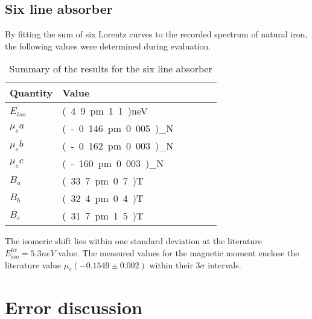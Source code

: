 \subsection{Six line absorber}
By fitting the sum of six Lorentz curves to the recorded spectrum of natural iron, the following values were determined during evaluation.
\begin{table}[H]\centering
	\begin{tabular}{@{}llllll@{}}
		\toprule
		 Quantity& Value \\
		\midrule
		$\overline{E_{iso}}$ & \unit{(4.9\pm1.1)}{neV}\\
		$\mu_ea$ & \unit{(-0.146\pm0.005)}{\mu_N} \\
		$\mu_eb$ & \unit{(-0.162\pm0.003)}{\mu_N}\\
		$\mu_ec$ & \unit{(-160\pm0.003)}{\mu_N}\\
		$B_a$ & \unit{(33.7\pm0.7)}{T}  \\
		$B_b$ & \unit{(32.4\pm0.4)}{T}  \\
		$B_c$ & \unit{(31.7\pm1.5)}{T}  \\ 
		\bottomrule
	\end{tabular}
	\caption[Summary six line absorber]{Summary of the results for the six line absorber}
	\label{tb:summary:sixline abs}
\end{table}
The isomeric shift lies within one standard deviation at the literature $E^{lit}_{iso}=\unit{5.3}{neV}$ value. The measured values for the magnetic moment enclose the literature  value $\mu_e (-0.1549\pm0.002)$\cite{stone} within their 3$\sigma$ intervals.

\section{Error discussion}
